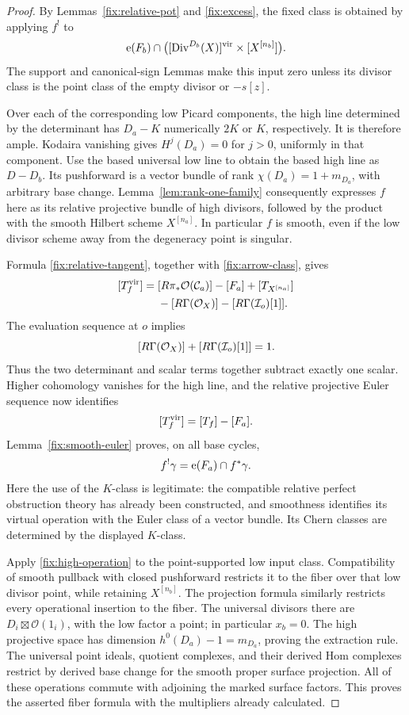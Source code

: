 \begin{proof}
By Lemmas~\ref{fix:relative-pot} and \ref{fix:excess},
the fixed class is obtained by applying \(f^!\) to
\[
 \operatorname{e}(F_b)\cap
 \bigl([\operatorname{Div}^{D_b}(X)]^{\mathrm{vir}}\times[X^{[n_b]}]\bigr).
\]
The support and canonical-sign Lemmas make this input
zero unless its divisor class is the point class of the
empty divisor or \(-s[z]\).

Over each of the corresponding low Picard components,
the high line determined by the determinant has
\(D_a-K\) numerically \(2K\) or \(K\), respectively.
It is therefore ample.  Kodaira vanishing gives
\(H^j(D_a)=0\) for \(j>0\), uniformly in that component.
Use the based universal low line to obtain the based high
line as \(D-D_b\).  Its pushforward is a vector bundle
of rank \(\chi(D_a)=1+m_{D_a}\), with arbitrary base
change.  Lemma~\ref{lem:rank-one-family} consequently
expresses \(f\) here as its relative projective bundle
of high divisors, followed by the product with the smooth
Hilbert scheme \(X^{[n_a]}\).  In particular \(f\) is smooth,
even if the low divisor scheme away from the degeneracy
point is singular.

Formula \eqref{fix:relative-tangent}, together with
\eqref{fix:arrow-class}, gives
\[
\begin{aligned}
 [T_f^\vir]
  ={}&[R\pi_*\mathcal O(\mathcal C_a)]-[F_a]
        +[T_{X^{[n_a]}}]\\
    &-[\RGamma(\mathcal O_X)]
        -[\RGamma(\mathcal I_o)[1]].
\end{aligned}
\]
The evaluation sequence at \(o\) implies
\[
 [R\Gamma(\mathcal O_X)]
       +[R\Gamma(\mathcal I_o)[1]]=1.
\]
Thus the two determinant and scalar terms together
subtract exactly one scalar.  Higher cohomology vanishes
for the high line, and the relative projective Euler
sequence now identifies
\[
 [T_f^{\mathrm{vir}}]=[T_f]-[F_a].
\]
Lemma~\ref{fix:smooth-euler} proves, on all base cycles,
\begin{equation}\label{fix:high-operation}
 f^!\gamma=\operatorname{e}(F_a)\cap f^*\gamma.
\end{equation}
Here the use of the \(K\)-class is legitimate: the
compatible relative perfect obstruction theory has
already been constructed, and smoothness identifies
its virtual operation with the Euler class of a vector
bundle.  Its Chern classes are determined by the
displayed \(K\)-class.

Apply \eqref{fix:high-operation} to the point-supported
low input class.  Compatibility of smooth pullback with
closed pushforward restricts it to the fiber over that
low divisor point, while retaining \(X^{[n_b]}\).
The projection formula similarly restricts every
operational insertion to the fiber.  The universal
divisors there are \(D_i\boxtimes\mathcal O(1_i)\),
with the low factor a point; in particular \(x_b=0\).
The high projective space has dimension
\(h^0(D_a)-1=m_{D_a}\), proving the extraction rule.
The universal point ideals, quotient complexes, and
their derived Hom complexes restrict by derived base
change for the smooth proper surface projection.
All of these operations commute with adjoining the
marked surface factors.  This proves the asserted
fiber formula with the multipliers already calculated.
\end{proof}

